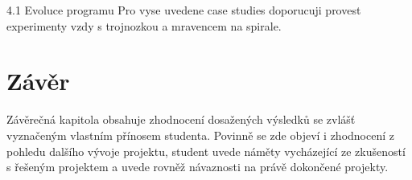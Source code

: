 4.1 Evoluce programu
Pro vyse uvedene case studies doporucuji provest experimenty vzdy s
trojnozkou a mravencem na spirale.



\chapter{Závěr}
Závěrečná kapitola obsahuje zhodnocení dosažených výsledků se zvlášť vyznačeným vlastním přínosem studenta. Povinně se zde objeví i zhodnocení z pohledu dalšího vývoje projektu, student uvede náměty vycházející ze zkušeností s řešeným projektem a uvede rovněž návaznosti na právě dokončené projekty.


